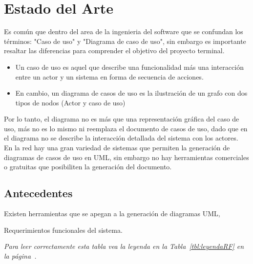 \chapter{Estado del Arte}


	Es común que dentro del area de la ingenieria del software que se confundan los términos: "Caso de uso" y "Diagrama de caso de uso", sin embargo es importante resaltar las diferencias para comprender el objetivo del proyecto terminal.
	
	 \begin{itemize}
		\item Un caso de uso es aquel que describe una  funcionalidad más una interacción entre un actor y un sistema en forma de secuencia de acciones.
		
		\item En cambio, un diagrama de casos de uso es la ilustración de un grafo con dos tipos de nodos (Actor y caso de uso) 
	\end{itemize}

	Por lo tanto, el diagrama no es más que una representación gráfica del caso de uso, más no es lo mismo ni reemplaza el documento de casos de uso, dado que en el diagrama no se describe la interacción detallada del sistema con los actores.\\
	
	
	En la red hay una gran variedad de sistemas que permiten la generación de diagramas de casos de uso en UML, sin embargo no hay herramientas comerciales o gratuitas que posibiliten la generación del documento.
	


\section{Antecedentes}

	Existen herramientas que se apegan a la generación de diagramas UML, 


\begin{table}[htbp!]
	\begin{requerimientosU}
	\end{requerimientosU}
    \caption{Requerimientos funcionales del sistema.}
    {\footnotesize\em Para leer correctamente esta tabla vea la leyenda en la Tabla~\ref{tbl:leyendaRF} en la página~\pageref{tbl:leyendaRF}.}
    \label{tbl:reqFunc}
\end{table}




